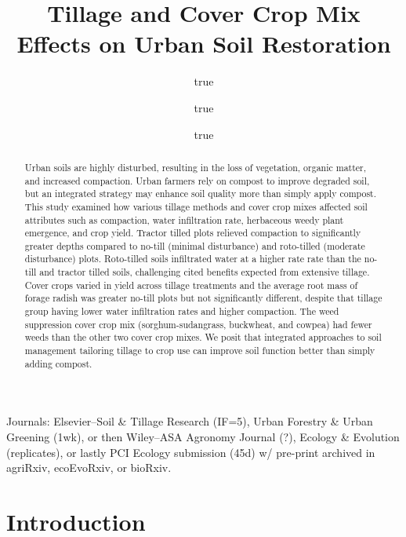 \documentclass[
]{article}
\title{Tillage and Cover Crop Mix Effects on Urban Soil Restoration}
\author{true \and true \and true}
\date{}
\begin{document}
\maketitle
\begin{abstract}
Urban soils are highly disturbed, resulting in the loss of vegetation, organic matter, and increased compaction. Urban farmers rely on compost to improve degraded soil, but an integrated strategy may enhance soil quality more than simply apply compost. This study examined how various tillage methods and cover crop mixes affected soil attributes such as compaction, water infiltration rate, herbaceous weedy plant emergence, and crop yield. Tractor tilled plots relieved compaction to significantly greater depths compared to no-till (minimal disturbance) and roto-tilled (moderate disturbance) plots. Roto-tilled soils infiltrated water at a higher rate rate than the no-till and tractor tilled soils, challenging cited benefits expected from extensive tillage. Cover crops varied in yield across tillage treatments and the average root mass of forage radish was greater no-till plots but not significantly different, despite that tillage group having lower water infiltration rates and higher compaction. The weed suppression cover crop mix (sorghum-sudangrass, buckwheat, and cowpea) had fewer weeds than the other two cover crop mixes. We posit that integrated approaches to soil management tailoring tillage to crop use can improve soil function better than simply adding compost.
\end{abstract}

{
\setcounter{tocdepth}{2}
\tableofcontents
}
Journals: Elsevier--Soil \& Tillage Research (IF=5), Urban Forestry \& Urban Greening (1wk), or then Wiley--ASA Agronomy Journal (?), Ecology \& Evolution (replicates), or lastly PCI Ecology submission (45d) w/ pre-print archived in agriRxiv, ecoEvoRxiv, or bioRxiv.

\hypertarget{introduction}{%
\section{Introduction}\label{introduction}}
\end{document}
